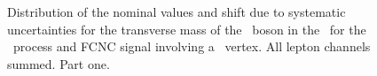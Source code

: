 \begin{figure}[htbp]
{	}
	\caption{Distribution of the nominal values and shift due to systematic uncertainties for the transverse mass of the \PW\ boson in the \STSR\ for the \WZ\ process and FCNC signal involving a \Zut\ vertex. All lepton channels summed. Part one.}
\label{fig:shiftBDTSTZut12}
\end{figure}
